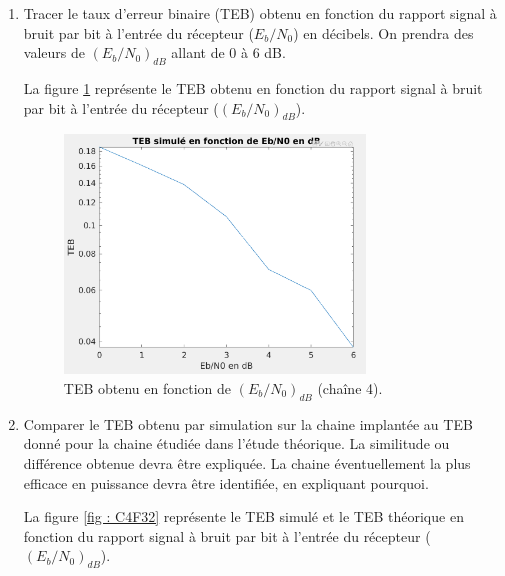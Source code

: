 \documentclass[frenchb]{article}
\begin{document}
\begin{enumerate}
	
		
        \item Tracer le taux d'erreur binaire (TEB) obtenu en fonction du rapport signal à bruit par bit à l'entrée du récepteur ($E_b/N_0$) en décibels. On prendra des valeurs de $\left(E_b/N_0\right)_{dB}$ allant de $0$ à $6$ dB.
        \par\leavevmode\par
       	\setlength\parindent{0.5cm}
       	La figure \ref{fig : C4F82} représente le TEB obtenu en fonction du rapport signal à bruit par bit à l'entrée du récepteur  ($\left(E_b/N_0\right)_{dB}$). 
        
        \begin{figure}[ht!]
		\centering
		\includegraphics[width=8cm]{C4F82.png}		              	    \caption{TEB obtenu en fonction de $\left(E_b/N_0\right)_{dB}$ (chaîne 4). \label{fig : C4F82}}
		\end{figure}
		
		\par\leavevmode\par
		\newpage
        \item Comparer le TEB obtenu par simulation sur la chaine implantée au TEB donné pour la chaine étudiée dans l'étude théorique. La similitude ou différence obtenue devra être expliquée. La chaine éventuellement la plus efficace en puissance devra être identifiée, en expliquant pourquoi.
        \par\leavevmode\par
       	\setlength\parindent{0.5cm}
       	La figure \ref{fig : C4F32} représente le TEB simulé et le TEB théorique en fonction du rapport signal à bruit par bit à l'entrée du récepteur  ($\left(E_b/N_0\right)_{dB}$). 
       	 

\end{enumerate}
\end{document}
